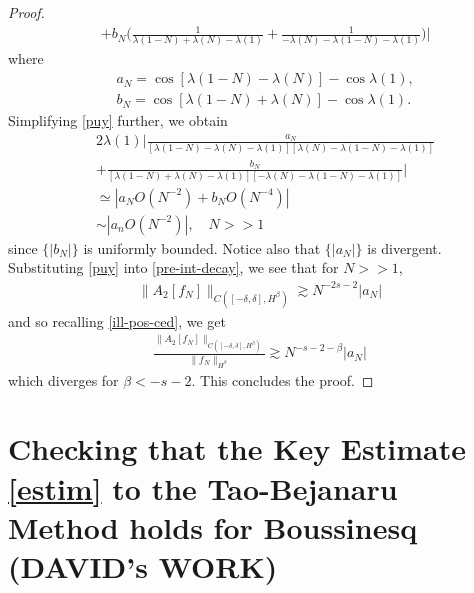 \documentclass{amsart}
\begin{document}
\begin{proof}
\begin{equation}
\begin{split}
  & + b_{N} \bigg ( \frac{1}{\lambda(1-N) + \lambda(N) - \lambda(1)} + \frac{1}{-\lambda(N) - \lambda(1-N) - \lambda(1)} 
  \bigg ) \bigg | 
\end{split}
\end{equation}
%
%
where
%
%
\begin{equation*}
\begin{split}
  & a_{N} =   \cos[\lambda(1-N) - \lambda(N)] - \cos \lambda(1),
  \\
  & b_{N} =  \cos[\lambda(1-N) + \lambda(N)] - \cos \lambda(1).
\end{split}
\end{equation*}
%
Simplifying \eqref{puy} further, we obtain
%
%
\begin{equation*}
\begin{split}
  & 2 \lambda(1) \bigg |  \frac{a_{N}}{[\lambda(1-N) - \lambda(N) - \lambda(1)][\lambda(N) - \lambda(1-N) - \lambda(1)]} 
  \\
  & +  \frac{b_{N}}{[\lambda(1-N) + \lambda(N) - \lambda(1)][-\lambda(N) - \lambda(1-N) - \lambda(1)]} 
   \bigg |
   \\
   & \simeq | a_{N} O(N^{-2}) + b_{N} O(N^{-4}) | 
   \\
   & \sim | a_{n} O(N^{-2})|, \quad N > >1
\end{split}
\end{equation*}
%
since $\{|b_{N}|\}$ is uniformly bounded. Notice also that $\{|a_{N}|\}$ is divergent. Substituting \eqref{puy} into \eqref{pre-int-decay}, we see that for $N > > 1$,  
%
%
\begin{equation*}
\begin{split}
\|A_{2}[f_{N}]\|_{C( [-\delta, \delta], H^{\beta})}
\gtrsim N^{-2 s -2}|a_{N}| 
\end{split}
\end{equation*}
%
%
and so recalling \eqref{ill-pos-ced}, we get
%
%
\begin{equation*}
\begin{split}
\frac{\|A_{2}[f_{N}]\|_{C([-\delta, \delta], H^{\beta})}}{\| f_{N}
\|_{H^{\beta}}} \gtrsim N^{-s -2 - \beta} | a_{N} |
\end{split}
\end{equation*}
%
%
which diverges for $\beta < -s -2$. This concludes the proof.
%
%
%
%
%
\end{proof}
\section{Checking that the Key Estimate \eqref{estim} to the Tao-Bejanaru Method holds for Boussinesq (DAVID's WORK)}
\end{document}
